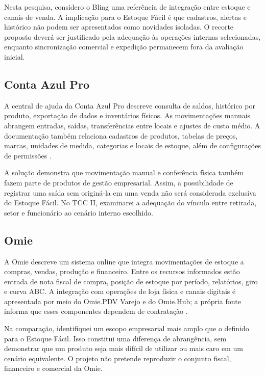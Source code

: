 Nesta pesquisa, considero o Bling uma referência de integração entre estoque e canais de venda. A implicação para o Estoque Fácil é que cadastros, alertas e histórico não podem ser apresentados como novidades isoladas. O recorte proposto deverá ser justificado pela adequação às operações internas selecionadas, enquanto sincronização comercial e expedição permanecem fora da avaliação inicial.

\subsection{Conta Azul Pro}

A central de ajuda da Conta Azul Pro descreve consulta de saldos, histórico por produto, exportação de dados e inventários físicos. As movimentações manuais abrangem entradas, saídas, transferências entre locais e ajustes de custo médio. A documentação também relaciona cadastros de produtos, tabelas de preços, marcas, unidades de medida, categorias e locais de estoque, além de configurações de permissões \cite{ContaAzulEstoque}.

A solução demonstra que movimentação manual e conferência física também fazem parte de produtos de gestão empresarial. Assim, a possibilidade de registrar uma saída sem originá-la em uma venda não será considerada exclusiva do Estoque Fácil. No TCC II, examinarei a adequação do vínculo entre retirada, setor e funcionário ao cenário interno escolhido.

\subsection{Omie}

A Omie descreve um sistema online que integra movimentações de estoque a compras, vendas, produção e financeiro. Entre os recursos informados estão entrada de nota fiscal de compra, posição de estoque por período, relatórios, giro e curva ABC. A integração com operações de loja física e canais digitais é apresentada por meio do Omie.PDV Varejo e do Omie.Hub; a própria fonte informa que esses componentes dependem de contratação \cite{OmieEstoque}.

Na comparação, identifiquei um escopo empresarial mais amplo que o definido para o Estoque Fácil. Isso constitui uma diferença de abrangência, sem demonstrar que um produto seja mais difícil de utilizar ou mais caro em um cenário equivalente. O projeto não pretende reproduzir o conjunto fiscal, financeiro e comercial da Omie.

